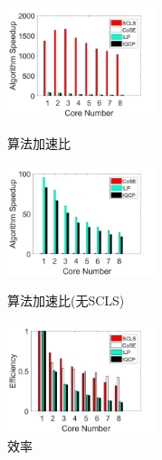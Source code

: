 \begin{frame}
\begin{figure}[htbp]
\centering
\begin{minipage}[t]{0.3\linewidth}
\centering
\includegraphics[width=1.7in]{figures/Multiple}
\caption{算法加速比}
\label{fig:Multiple}
\end{minipage}
\hfill
\begin{minipage}[t]{0.3\linewidth}
\centering
\includegraphics[width=1.7in]{figures/MultipleNoSCLS}
\caption{算法加速比(无SCLS)}
\label{fig:MultipleNoSCLS}
\end{minipage}
\hfill
\begin{minipage}[t]{0.3\linewidth}
\centering
\includegraphics[width=1.7in]{figures/Efficiency}
 \caption{效率}
 \label{fig:Efficiency}
\end{minipage}
\end{figure}
\end{frame}

